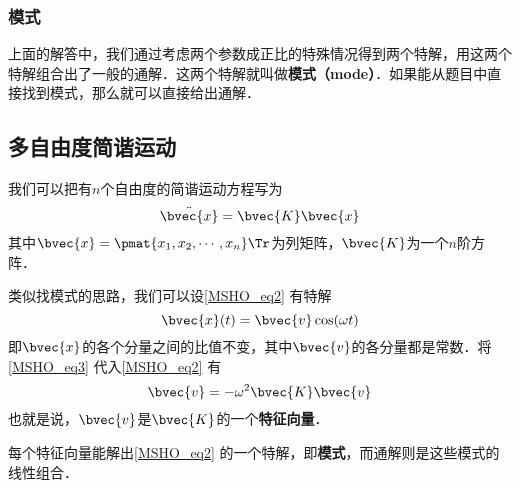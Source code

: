 \subsubsection{模式}

上面的解答中，我们通过考虑两个参数成正比的特殊情况得到两个特解，用这两个特解组合出了一般的通解．这两个特解就叫做\textbf{模式（mode）}．如果能从题目中直接找到模式，那么就可以直接给出通解．




\subsection{多自由度简谐运动}

我们可以把有$n$个自由度的简谐运动方程写为
\begin{equation}\label{MSHO_eq2}
\ddot{\bvec{x}} = \bvec{K}\bvec{x}
\end{equation}
其中$\bvec{x}=\pmat{x_1, x_2, \cdots, x_n}\Tr$为列矩阵，$\bvec{K}$为一个$n$阶方阵．

类似找模式的思路，我们可以设\autoref{MSHO_eq2} 有特解
\begin{equation}\label{MSHO_eq3}
\bvec{x}(t) = \bvec{v}\cos(\omega t)
\end{equation}
即$\bvec{x}$的各个分量之间的比值不变，其中$\bvec{v}$的各分量都是常数．将\autoref{MSHO_eq3} 代入\autoref{MSHO_eq2} 有
\begin{equation}
\bvec{v} = -\omega^2\bvec{K}\bvec{v}
\end{equation}
也就是说，$\bvec{v}$是$\bvec{K}$的一个\textbf{特征向量}．

每个特征向量能解出\autoref{MSHO_eq2} 的一个特解，即\textbf{模式}，而通解则是这些模式的线性组合．







